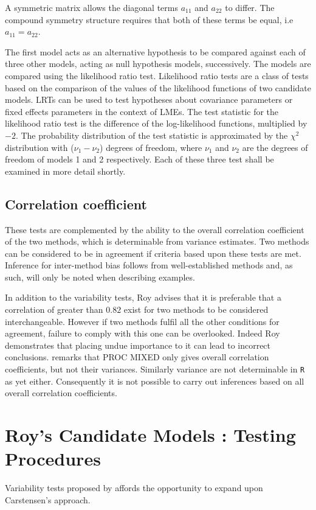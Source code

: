 \documentclass[12pt, a4paper]{report}
\theoremstyle{plain}
\theoremstyle{definition}
\theoremstyle{remark}
\begin{document}
A symmetric matrix allows the diagonal terms $a_{11}$ and $a_{22}$ to differ. The compound symmetry structure requires that both of these terms be equal, i.e $a_{11} = a_{22}$.

The first model acts as an alternative hypothesis to be compared against each of three other models, acting as null hypothesis models, successively. The models are compared using the likelihood ratio test. Likelihood ratio tests are a class of tests based on the comparison of the values of the likelihood functions of two candidate models. LRTs can be used to test hypotheses about covariance parameters or fixed effects parameters in the context of LMEs. The test statistic for the likelihood ratio test is the difference of the log-likelihood functions, multiplied by $-2$.
The probability distribution of the test statistic is approximated by the $\chi^2$ distribution with ($\nu_{1} - \nu_{2}$) degrees of freedom, where $\nu_{1}$ and $\nu_{2}$ are the degrees of freedom of models 1 and 2 respectively. Each of these three test shall be examined in more detail shortly.

\subsection{Correlation coefficient}

These tests are complemented by the ability to the overall correlation coefficient of the two methods, which is determinable from variance estimates. Two methods can be considered to be in agreement if criteria based upon these tests are met. Inference for inter-method bias follows from well-established methods and, as such, will only be noted when describing examples.


In addition to the variability tests, Roy advises that it is preferable that a correlation of greater than $0.82$ exist for two methods to be considered interchangeable. However if two methods fulfil all the other conditions for agreement, failure to comply with this one can be overlooked. Indeed Roy demonstrates that placing undue importance to it can lead to incorrect conclusions.
\citet{roy} remarks that PROC MIXED only gives overall correlation coefficients, but not their variances. Similarly variance are not determinable in \texttt{R} as yet either. Consequently it is not possible to carry out inferences based on all overall correlation coefficients.


\section{Roy's Candidate Models : Testing Procedures}
Variability tests proposed by \citet{ARoy2009} affords the opportunity to expand upon Carstensen's approach.
\end{document}
